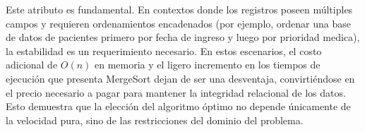 Este atributo es fundamental. En contextos donde los registros poseen múltiples campos y requieren ordenamientos encadenados (por ejemplo, ordenar una base de datos de pacientes primero por fecha de ingreso y luego por prioridad medica), la estabilidad es un requerimiento necesario. En estos escenarios, el costo adicional de $O(n)$ en memoria y el ligero incremento en los tiempos de ejecución que presenta MergeSort dejan de ser una desventaja, convirtiéndose en el precio necesario a pagar para mantener la integridad relacional de los datos. Esto demuestra que la elección del algoritmo óptimo no depende únicamente de la velocidad pura, sino de las restricciones del dominio del problema.